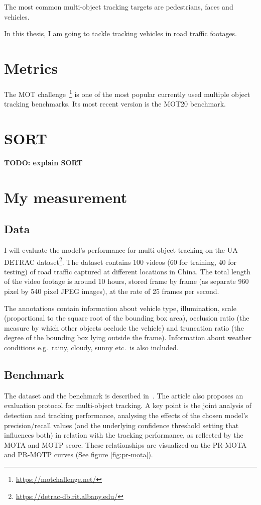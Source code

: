 The most common multi-object tracking targets are pedestrians, faces and vehicles. 

In this thesis, I am going to tackle tracking vehicles in road traffic footages.

\section{Metrics}

The MOT challenge~\footnote{\url{https://motchallenge.net/}} is one of the most popular currently used multiple object tracking benchmarks. Its most recent version is the MOT20 benchmark.

\section{SORT}

\textbf{TODO: explain SORT}

\section{My measurement}
\subsection{Data}

I will evaluate the model's performance for multi-object tracking on the UA-DETRAC dataset\footnote{\url{https://detrac-db.rit.albany.edu/}}. The dataset contains 100 videos (60 for training, 40 for testing) of road traffic captured at different locations in China. The total length of the video footage is around 10 hours, stored frame by frame (as separate 960 pixel by 540 pixel JPEG images), at the rate of 25 frames per second.

The annotations contain information about vehicle type, illumination, scale (proportional to the square root of the bounding box area), occlusion ratio (the measure by which other objects occlude the vehicle) and truncation ratio (the degree of the bounding box lying outside the frame). Information about weather conditions e.g.~rainy, cloudy, sunny etc.~is also included.

\subsection{Benchmark}

The dataset and the benchmark is described in~\cite{CVIU_UA-DETRAC}. The article also proposes an evaluation protocol for multi-object tracking. A key point is the joint analysis of detection and tracking performance, analysing the effects of the chosen model's precision/recall values (and the underlying confidence threshold setting that influences both) in relation with the tracking performance, as reflected by the MOTA and MOTP score. These relationships are visualized on the PR-MOTA and PR-MOTP curves (See figure \ref{fig:pr-mota}).

